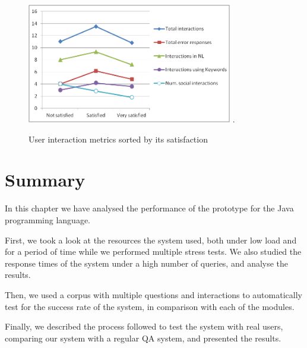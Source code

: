 \begin{figure}[!tbh]
  \centering
  \includegraphics[width=0.8\textwidth]{img/test/exp_satisfaction.png}
  \DeclareGraphicsExtensions.  
  \caption{User interaction metrics sorted by its satisfaction}
  \label{fig:exp_satisfaction}
\end{figure}

\section{Summary}

In this chapter we have analysed the performance of the prototype for the Java programming language.

First, we took a look at the resources the system used, both under low load and for a period of time while we performed multiple stress tests. We also studied the response times of the system under a high number of queries, and analyse the results.

Then, we used a corpus with multiple questions and interactions to automatically test for the success rate of the system, in comparison with each of the modules.

Finally, we described the process followed to test the system with real users, comparing our system with a regular \ac{QA} system, and presented the results.